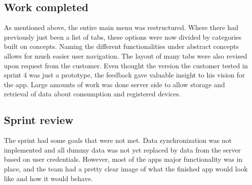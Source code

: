 \subsection{Work completed}
As mentioned above, the entire main menu was restructured. Where there had previously just been a list of tabs, these options were now divided by categories built on concepts. Naming the different functionalities under abstract concepts allows for much easier user navigation. The layout of many tabs were also revised upon request from the customer. Even thought the version the customer tested in sprint 4 was just a prototype, the feedback gave valuable insight to his vision for the app. 	Large amounts of work was done server side to allow storage and retrieval of data about consumption and registered devices. 

\subsection{Sprint review}
The sprint had some goals that were not met. Data synchronization was not implemented and all dummy data was not yet replaced by data from the server based on user credentials. However, most of the apps major functionality was in place, and the team had a pretty clear image of what the finished app would look like and how it would behave.
